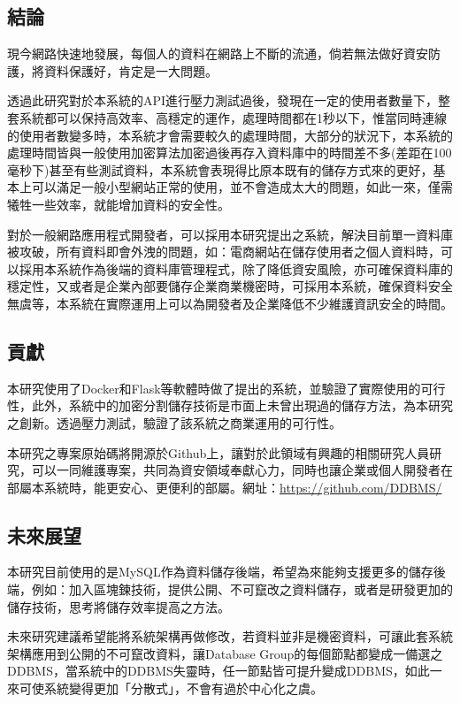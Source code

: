 \documentclass[11pt,twocolumn]{article}
\begin{document}
\subsection{結論}
現今網路快速地發展，每個人的資料在網路上不斷的流通，倘若無法做好資安防護，將資料保護好，肯定是一大問題。\par
透過此研究對於本系統的API進行壓力測試過後，發現在一定的使用者數量下，整套系統都可以保持高效率、高穩定的運作，處理時間都在1秒以下，惟當同時連線的使用者數變多時，本系統才會需要較久的處理時間，大部分的狀況下，本系統的處理時間皆與一般使用加密算法加密過後再存入資料庫中的時間差不多(差距在100毫秒下)甚至有些測試資料，本系統會表現得比原本既有的儲存方式來的更好，基本上可以滿足一般小型網站正常的使用，並不會造成太大的問題，如此一來，僅需犧牲一些效率，就能增加資料的安全性。\par
對於一般網路應用程式開發者，可以採用本研究提出之系統，解決目前單一資料庫被攻破，所有資料即會外洩的問題，如：電商網站在儲存使用者之個人資料時，可以採用本系統作為後端的資料庫管理程式，除了降低資安風險，亦可確保資料庫的穩定性，又或者是企業內部要儲存企業商業機密時，可採用本系統，確保資料安全無虞等，本系統在實際運用上可以為開發者及企業降低不少維護資訊安全的時間。\par
\subsection{貢獻}
本研究使用了Docker和Flask等軟體時做了提出的系統，並驗證了實際使用的可行性，此外，系統中的加密分割儲存技術是市面上未曾出現過的儲存方法，為本研究之創新。透過壓力測試，驗證了該系統之商業運用的可行性。 \par
本研究之專案原始碼將開源於Github上，讓對於此領域有興趣的相關研究人員研究，可以一同維護專案，共同為資安領域奉獻心力，同時也讓企業或個人開發者在部屬本系統時，能更安心、更便利的部屬。網址：\url{https://github.com/DDBMS/} \par

\subsection{未來展望}
本研究目前使用的是MySQL作為資料儲存後端，希望為來能夠支援更多的儲存後端，例如：加入區塊鍊技術，提供公開、不可竄改之資料儲存，或者是研發更加的儲存技術，思考將儲存效率提高之方法。\par
未來研究建議希望能將系統架構再做修改，若資料並非是機密資料，可讓此套系統架構應用到公開的不可竄改資料，讓Database Group的每個節點都變成一備選之DDBMS，當系統中的DDBMS失靈時，任一節點皆可提升變成DDBMS，如此一來可使系統變得更加「分散式」，不會有過於中心化之虞。\par



\end{document}
